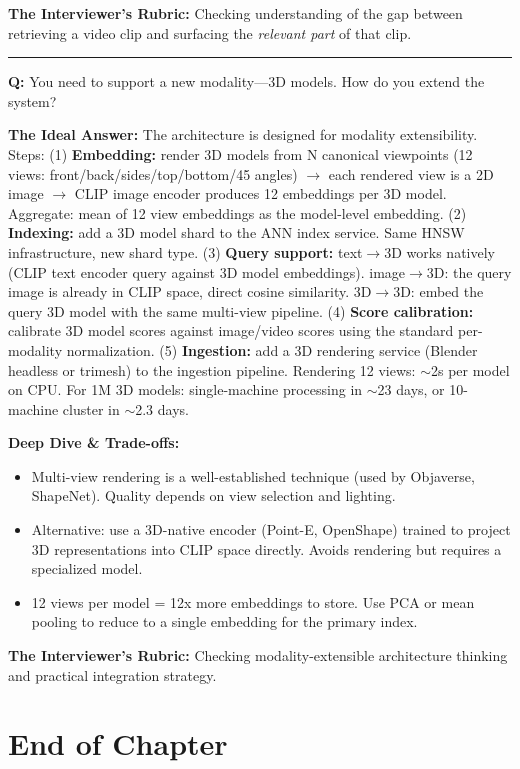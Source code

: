 \textbf{The Interviewer's Rubric:} Checking understanding of the gap between retrieving a video clip and surfacing the \emph{relevant part} of that clip.

\bigskip\hrule\bigskip

\textbf{Q:} You need to support a new modality---3D models. How do you extend the system?

\textbf{The Ideal Answer:} The architecture is designed for modality extensibility. Steps: (1) \textbf{Embedding:} render 3D models from N canonical viewpoints (12 views: front/back/sides/top/bottom/45\textdegree{} angles) $\rightarrow$ each rendered view is a 2D image $\rightarrow$ CLIP image encoder produces 12 embeddings per 3D model. Aggregate: mean of 12 view embeddings as the model-level embedding. (2) \textbf{Indexing:} add a 3D model shard to the ANN index service. Same HNSW infrastructure, new shard type. (3) \textbf{Query support:} text$\rightarrow$3D works natively (CLIP text encoder query against 3D model embeddings). image$\rightarrow$3D: the query image is already in CLIP space, direct cosine similarity. 3D$\rightarrow$3D: embed the query 3D model with the same multi-view pipeline. (4) \textbf{Score calibration:} calibrate 3D model scores against image/video scores using the standard per-modality normalization. (5) \textbf{Ingestion:} add a 3D rendering service (Blender headless or trimesh) to the ingestion pipeline. Rendering 12 views: $\sim$2s per model on CPU. For 1M 3D models: single-machine processing in $\sim$23 days, or 10-machine cluster in $\sim$2.3 days.

\textbf{Deep Dive \& Trade-offs:}
\begin{itemize}
  \item Multi-view rendering is a well-established technique (used by Objaverse, ShapeNet). Quality depends on view selection and lighting.
  \item Alternative: use a 3D-native encoder (Point-E, OpenShape) trained to project 3D representations into CLIP space directly. Avoids rendering but requires a specialized model.
  \item 12 views per model = 12x more embeddings to store. Use PCA or mean pooling to reduce to a single embedding for the primary index.
\end{itemize}

\textbf{The Interviewer's Rubric:} Checking modality-extensible architecture thinking and practical integration strategy.

\section*{End of Chapter}

